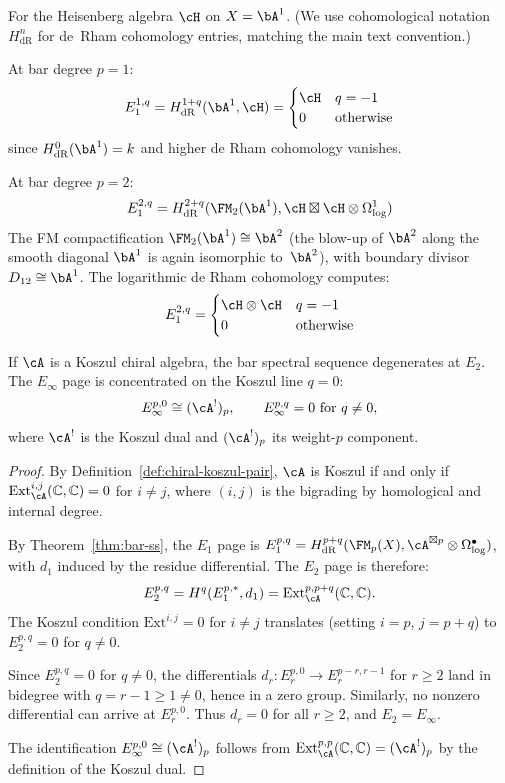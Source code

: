 \begin{computation}
\label{comp:e1-heisenberg}
For the Heisenberg algebra $\cH$ on $X = \bA^1$. (We use cohomological notation $H^n_{\mathrm{dR}}$ for de~Rham cohomology entries, matching the main text convention.)

At bar degree $p = 1$:
\[
E_1^{1,q} = H^{1+q}_{\mathrm{dR}}(\bA^1, \cH) = \begin{cases}
\cH & q = -1 \\ 0 & \text{otherwise}
\end{cases}
\]
since $H^0_{\mathrm{dR}}(\bA^1) = k$ and higher de Rham cohomology vanishes.

At bar degree $p = 2$:
\[
E_1^{2,q} = H^{2+q}_{\mathrm{dR}}(\FM_2(\bA^1), \cH \boxtimes \cH \otimes \Omega^1_{\log})
\]
The FM compactification $\FM_2(\bA^1) \cong \bA^2$ (the blow-up of $\bA^2$ along the smooth diagonal $\bA^1$ is again isomorphic to~$\bA^2$), with boundary divisor
$D_{12} \cong \bA^1$. The logarithmic de Rham cohomology computes:
\[
E_1^{2,q} = \begin{cases}
\cH \otimes \cH & q = -1 \\ 0 & \text{otherwise}
\end{cases}
\]
\end{computation}

\begin{proposition}
\label{prop:degen-koszul}
If $\cA$ is a Koszul chiral algebra, the bar spectral sequence
degenerates at $E_2$. The $E_\infty$ page is concentrated on the
Koszul line $q = 0$:
\[
E_\infty^{p,0} \cong (\cA^!)_p, \qquad
E_\infty^{p,q} = 0 \text{ for } q \neq 0,
\]
where $\cA^!$ is the Koszul dual and $(\cA^!)_p$ its weight-$p$ component.
\end{proposition}

\begin{proof}
By Definition~\ref{def:chiral-koszul-pair}, $\cA$ is Koszul if and only if $\mathrm{Ext}^{i,j}_{\cA}(\mathbb{C}, \mathbb{C}) = 0$ for $i \neq j$, where $(i,j)$ is the bigrading by homological and internal degree.

By Theorem~\ref{thm:bar-ss}, the $E_1$ page is $E_1^{p,q} = H^{p+q}_{\mathrm{dR}}(\FM_p(X), \cA^{\boxtimes p} \otimes \Omega^\bullet_{\log})$, with $d_1$ induced by the residue differential. The $E_2$ page is therefore:
\[
E_2^{p,q} = H^q(E_1^{p,*}, d_1) = \mathrm{Ext}^{p,p+q}_{\cA}(\mathbb{C}, \mathbb{C}).
\]
The Koszul condition $\mathrm{Ext}^{i,j} = 0$ for $i \neq j$ translates (setting $i = p$, $j = p + q$) to $E_2^{p,q} = 0$ for $q \neq 0$.

Since $E_2^{p,q} = 0$ for $q \neq 0$, the differentials $d_r: E_r^{p,0} \to E_r^{p-r, r-1}$ for $r \geq 2$ land in bidegree with $q = r - 1 \geq 1 \neq 0$, hence in a zero group. Similarly, no nonzero differential can arrive at $E_r^{p,0}$. Thus $d_r = 0$ for all $r \geq 2$, and $E_2 = E_\infty$.

The identification $E_\infty^{p,0} \cong (\cA^!)_p$ follows from $\mathrm{Ext}^{p,p}_{\cA}(\mathbb{C}, \mathbb{C}) = (\cA^!)_p$ by the definition of the Koszul dual.
\end{proof}


